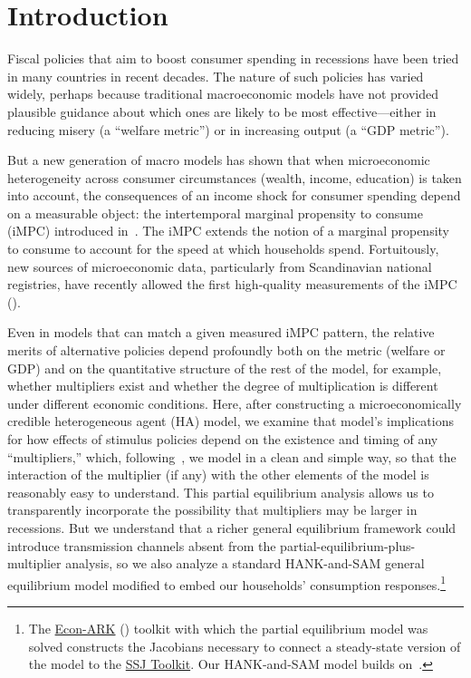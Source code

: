 \documentclass[\latexroot/\projectname]{subfiles}
\begin{document}
\section{Introduction}
\whenintegrated{\label{sec:intro}} %
\setcounter{page}{0}

Fiscal policies that aim to boost consumer spending in recessions have been tried in many countries in recent decades.  The nature of such policies has varied widely, perhaps because traditional macroeconomic models have not provided plausible guidance about which ones are likely to be most effective---either in reducing misery (a ``welfare metric'') or in increasing output (a ``GDP metric'').

But a new generation of macro models has shown that when microeconomic heterogeneity across consumer circumstances (wealth, income, education) is taken into account, the consequences of an income shock for consumer spending depend on a measurable object: the intertemporal marginal propensity to consume (iMPC) introduced in~\cite{auclert2024IKC}.  The iMPC extends the notion of a marginal propensity to consume to account for the speed at which households spend.  Fortuitously, new sources of microeconomic data, particularly from Scandinavian national registries, have recently allowed the first high-quality measurements of the iMPC (\cite{fagereng-mpc-2021}).

Even in models that can match a given measured iMPC pattern, the relative merits of alternative policies depend profoundly both on the metric (welfare or GDP) and on the quantitative structure of the rest of the model, for example, whether multipliers exist and whether the degree of multiplication is different under different economic conditions. Here, after constructing a microeconomically credible heterogeneous agent (HA) model, we examine that model's implications for how effects of stimulus policies depend on the existence and timing of any ``multipliers,'' which, following~\cite{kmpHandbook}, we model in a clean and simple way, so that the interaction of the multiplier (if any) with the other elements of the model is reasonably easy to understand.
This partial equilibrium analysis allows us to transparently incorporate the possibility that multipliers may be larger in recessions.  But we understand that a richer general equilibrium framework could introduce transmission channels absent from the partial-equilibrium-plus-multiplier analysis, so we also analyze a standard HANK-and-SAM general equilibrium model modified to embed our households' consumption responses.\footnote{The \href{https://econ-ark.org}{Econ-ARK} (\cite{carroll_et_al-proc-scipy-2018}) toolkit with which the partial equilibrium model was solved constructs the Jacobians necessary to connect a steady-state version of the model to the \href{https://github.com/shade-econ/sequence-jacobian}{SSJ Toolkit}. Our HANK-and-SAM model builds on~\cite{Ravn2017,Ravn2021}.}
\end{document}
